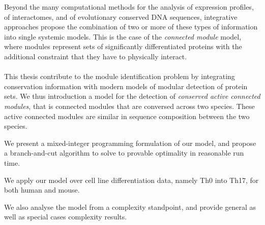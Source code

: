 Beyond the many computational methods for the analysis of expression profiles, of interactomes, and of evolutionary conserved DNA sequences, integrative approaches propose the combination of two or more of these types of information into single systemic models.
This is the case of the \emph{connected module} model, where modules represent sets of significantly differentiated proteins with the additional constraint that they have to physically interact.

\paragraph{}

This thesis contribute to the module identification problem by integrating conservation information with modern models of modular detection of protein sets.
We thus introduction a model for the detection of \emph{conserved active connected modules}, that is connected modules that are conversed across two species.
These active connected modules are similar in sequence composition between the two species.

We present a mixed-integer programming formulation of our model, and propose a branch-and-cut algorithm to solve to provable optimality in reasonable run time.

We apply our model over cell line differentiation data, namely Th0 into Th17, for both human and mouse.

We also analyse the model from a complexity standpoint, and provide general as well as special cases complexity results.

